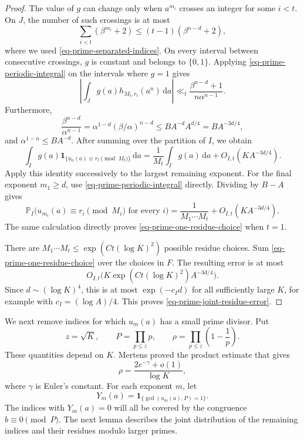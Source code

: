\documentclass[11pt,reqno]{amsart}
\numberwithin{equation}{section}
\begin{document}
\begin{proof}
The value of $g$ can change only when $a^{m_i}$ crosses an integer for some $i<t$. On $J$, the number of such crossings is at most
\[
 \sum_{i<t}(\beta^{m_i}+2)
 \le (t-1)(\beta^{n-d}+2),
\]
where we used \eqref{eq-prime-separated-indices}. On every interval between consecutive crossings, $g$ is constant and belongs to $\{0,1\}$. Applying \eqref{eq-prime-periodic-integral} on the intervals where $g=1$ gives
\[
 \left|\int_J g(a)h_{M_t,r_t}(a^n)\,\mathrm{d}a\right|
 \ll_t\frac{\beta^{n-d}+1}{n\alpha^{n-1}}.
\]
Furthermore,
\[
 \frac{\beta^{n-d}}{\alpha^{n-1}}
 =\alpha^{1-d}(\beta/\alpha)^{n-d}
 \le B A^{-d} A^{d/4}=B A^{-3d/4},
\]
and $\alpha^{1-n}\le B A^{-d}$. After summing over the partition of $I$, we obtain
\[
 \int_I g(a)\mathbf1_{\{u_n(a)\equiv r_t\pmod{M_t}\}}\,\mathrm{d}a
 =\frac1{M_t}\int_I g(a)\,\mathrm{d}a
   +O_{I,t}(K A^{-3d/4}).
\]
Apply this identity successively to the largest remaining exponent. For the final exponent $m_1\ge d$, use \eqref{eq-prime-periodic-integral} directly. Dividing by $B-A$ gives
\begin{equation}\label{eq-prime-one-residue-choice}
 \mathbb P_I\bigl(u_{m_i}(a)\equiv r_i\pmod{M_i}
                  \text{ for every }i\bigr)
 =\frac1{M_1\cdots M_t}+O_{I,t}(K A^{-3d/4}).
\end{equation}
The same calculation directly proves \eqref{eq-prime-one-residue-choice} when $t=1$.

There are $M_1\cdots M_t\le\exp(Ct(\log K)^2)$ possible residue choices. Sum \eqref{eq-prime-one-residue-choice} over the choices in $F$. The resulting error is at most
\[
 O_{I,t}\bigl(K\exp(Ct(\log K)^2)A^{-3d/4}\bigr).
\]
Since $d\sim(\log K)^4$, this is at most $\exp(-c_I d)$ for all sufficiently large $K$, for example with $c_I=(\log A)/4$. This proves \eqref{eq-prime-joint-residue-error}.
\end{proof}

We next remove indices for which $u_m(a)$ has a small prime divisor. Put
\[
 z=\sqrt K,\qquad P=\prod_{p\le z}p,
 \qquad \rho=\prod_{p\le z}\left(1-\frac1p\right).
\]
These quantities depend on $K$. Mertens \cite{Mertens} proved the product estimate that gives
\begin{equation}\label{eq-prime-sieve-density}
 \rho=\frac{2e^{-\gamma}+o(1)}{\log K},
\end{equation}
where $\gamma$ is Euler's constant. For each exponent $m$, let
\[
 Y_m(a)=\mathbf1_{\{\gcd(u_m(a),P)=1\}}.
\]
The indices with $Y_m(a)=0$ will all be covered by the congruence $b\equiv0\pmod P$. The next lemma describes the joint distribution of the remaining indices and their residues modulo larger primes.
\end{document}
